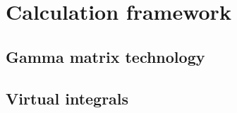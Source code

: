 \section{Calculation framework}

\subsection{Gamma matrix technology}

\subsection{Virtual integrals}

